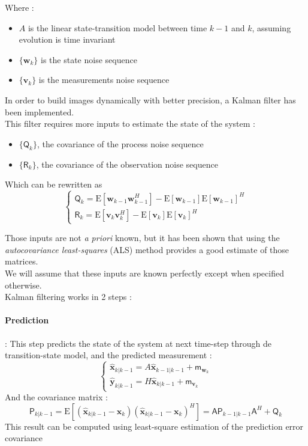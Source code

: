 \documentclass[titlepage]{article}
\newcommand{\moy}[1]{\boldsymbol{\mathsf{m}}_{#1}}
\newcommand{\autocorr}[1]{\expval{(#1)(#1)^H}}
\renewcommand{\expval}[1]{\text{E}\left[#1\right]}
\newcommand{\w}{\boldsymbol{w}}
\renewcommand{\v}{\boldsymbol{v}}
\newcommand{\Q}{\boldsymbol{\mathsf{Q}}}
\newcommand{\R}{\boldsymbol{\mathsf{R}}}
\newcommand{\A}{\boldsymbol{\mathsf{A}}}
\newcommand{\x}{\boldsymbol{x}}
\newcommand{\y}{\boldsymbol{y}}
\newcommand{\xp}{\widehat{\x}_{k|k-1}}
\newcommand{\xa}{\widehat{\x}_{k-1|k-1}}
\newcommand{\yp}{\widehat{\y}_{k|k-1}}
\newcommand{\Pp}{\boldsymbol{\mathsf{P}}_{k|k-1}}
\newcommand{\Pa}{\boldsymbol{\mathsf{P}}_{k-1|k-1}}
\begin{document}
	Where :
	\begin{itemize}
		\item $A$ is the linear state-transition model between time $k-1$ and $k$, assuming evolution is time invariant
		\item $\{\w_k\}$ is the state noise sequence
		\item $\{\v_k\}$ is the measurements noise sequence
	\end{itemize}
	
		
	In order to build images dynamically with better precision, a Kalman filter has been implemented.\\
	
	This filter requires more inputs to estimate the state of the system :
	\begin{itemize}
		\item $\{\Q_k\}$, the covariance of the process noise sequence
		\item $\{\R_k\}$, the covariance of the observation noise sequence
	\end{itemize}

	Which can be rewritten as
	$$
		\begin{cases}
			\Q_k = \expval{\w_{k-1}\w_{k-1}^H} - \expval{\w_{k-1}}\expval{\w_{k-1}}^H \\
			\R_k = \expval{\v_{k}\v_{k}^H} - \expval{\v_k}\expval{\v_k}^H 
		\end{cases}
	$$
	
	Those inputs are not \emph{a priori} known, but it has been shown that using the \emph{autocovariance least-squares} (ALS) method provides a good estimate of those matrices. \cite{ALS} \\
	We will assume that these inputs are known perfectly except when specified otherwise.\\
	
	Kalman filtering works in 2 steps :
	\paragraph{Prediction} : This step predicts the state of the system at next time-step through de transition-state model, and the predicted measurement :
	$$
	\begin{cases}
		\xp = A\xa + \moy{\w_k}\\
		\yp = H\xp + \moy{\v_k}
	\end{cases}
	$$
	And the covariance matrix :
	$$
		\Pp = \autocorr{\xp - \x_k} = \A\Pa \A^H + \Q_k
	$$
	This result can be computed using least-square estimation of the prediction error covariance\cite{intro_KF}
	
\end{document}
